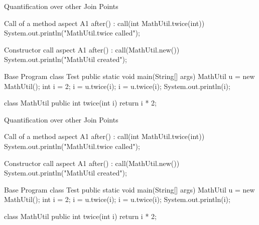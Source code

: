\begin{frame}[fragile]{Quantification over other Join Points}
	\begin{mycolumns}[widths={50,50},animation=none]
\begin{codetight}{Call of a method}
aspect A1 {
	after() : call(int MathUtil.twice(int)) {
		System.out.println("MathUtil.twice called");
	}
}
\end{codetight}
\begin{codetight}{Constructor call}
aspect A1 {
	after() : call(MathUtil.new()) {
		System.out.println("MathUtil created");
	}
}
\end{codetight}
	\mynextcolumn
\begin{codetight}{Base Program}
class Test {
	public static void main(String[] args) {
		MathUtil u = new MathUtil();
		int i = 2;
		i = u.twice(i);
		i = u.twice(i);
		System.out.println(i);
	}
}

class MathUtil {
	public int twice(int i) {
		return i * 2;
	}
}
\end{codetight}	
	\end{mycolumns}
\end{frame}

\begin{frame}[fragile]{Quantification over other Join Points}
	\begin{mycolumns}[widths={50,50},animation=none]
\begin{codetight}{Call of a method}
aspect A1 {
	after() : call(int MathUtil.twice(int)) {
		System.out.println("MathUtil.twice called");
	}
}
\end{codetight}
\begin{codetight}{Constructor call}
aspect A1 {
	after() : call(MathUtil.new()) {
		System.out.println("MathUtil created");
	}
}
\end{codetight}
	\mynextcolumn
\begin{codetight}{Base Program}
class Test {
	public static void main(String[] args) {
		MathUtil u = new MathUtil();
		int i = 2;
		i = u.twice(i);
		i = u.twice(i);
		System.out.println(i);
	}
}

class MathUtil {
	public int twice(int i) {
		return i * 2;
	}
}
\end{codetight}	
	\end{mycolumns}
\end{frame}

